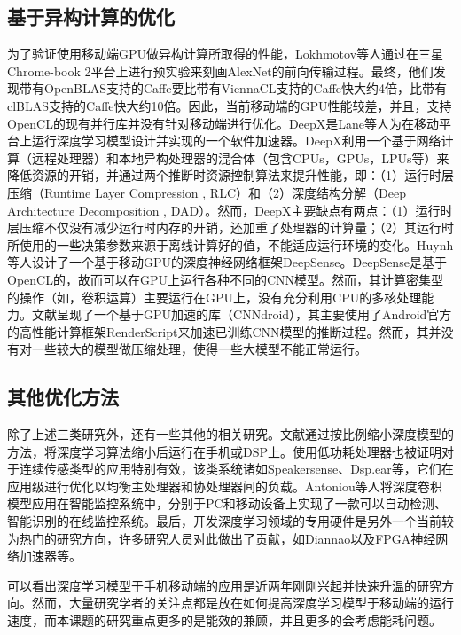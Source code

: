 \subsection{基于异构计算的优化}
为了验证使用移动端GPU做异构计算所取得的性能，Lokhmotov等人\cite{lokhmotov2016optimizing}通过在三星 Chrome-book 2平台上进行预实验来刻画AlexNet的前向传输过程。最终，他们发现带有OpenBLAS支持的Caffe\cite{jia2014caffe}要比带有ViennaCL支持的Caffe快大约4倍，比带有clBLAS支持的Caffe快大约10倍。因此，当前移动端的GPU性能较差，并且，支持OpenCL的现有并行库并没有针对移动端进行优化。DeepX是Lane等人\cite{lane2016deepx}为在移动平台上运行深度学习模型设计并实现的一个软件加速器。DeepX利用一个基于网络计算（远程处理器）和本地异构处理器的混合体（包含CPUs，GPUs，LPUs等）来降低资源的开销，并通过两个推断时资源控制算法来提升性能，即：（1）运行时层压缩（Runtime Layer Compression , RLC）和（2）深度结构分解（Deep Architecture Decomposition , DAD）。然而，DeepX主要缺点有两点：（1）运行时层压缩不仅没有减少运行时内存的开销，还加重了处理器的计算量；（2）其运行时所使用的一些决策参数来源于离线计算好的值，不能适应运行环境的变化。Huynh等人\cite{huynh2016deepsense}设计了一个基于移动GPU的深度神经网络框架DeepSense。DeepSense是基于OpenCL的，故而可以在GPU上运行各种不同的CNN模型。然而，其计算密集型的操作（如，卷积运算）主要运行在GPU上，没有充分利用CPU的多核处理能力。文献\cite{latifi2016cnndroid}呈现了一个基于GPU加速的库（CNNdroid），其主要使用了Android官方的高性能计算框架RenderScript来加速已训练CNN模型的推断过程。然而，其并没有对一些较大的模型做压缩处理，使得一些大模型不能正常运行。
\subsection{其他优化方法}
除了上述三类研究外，还有一些其他的相关研究。文献\cite{lane2015deepear,chen2014small,variani2014deep}通过按比例缩小深度模型的方法，将深度学习算法缩小后运行在手机或DSP上。使用低功耗处理器也被证明对于连续传感类型的应用特别有效，该类系统诸如Speakersense\cite{lu2011speakersense}、Dsp.ear\cite{georgiev2014dsp}等，它们在应用级进行优化以均衡主处理器和协处理器间的负载。Antoniou等人\cite{antoniou2016general}将深度卷积模型应用在智能监控系统中，分别于PC和移动设备上实现了一款可以自动检测、智能识别的在线监控系统。最后，开发深度学习领域的专用硬件是另外一个当前较为热门的研究方向，许多研究人员对此做出了贡献，如Diannao\cite{chen2014diannao}以及FPGA神经网络加速器\cite{zhang2015optimizing}等。

可以看出深度学习模型于手机移动端的应用是近两年刚刚兴起并快速升温的研究方向。然而，大量研究学者的关注点都是放在如何提高深度学习模型于移动端的运行速度，而本课题的研究重点更多的是能效的兼顾，并且更多的会考虑能耗问题。

